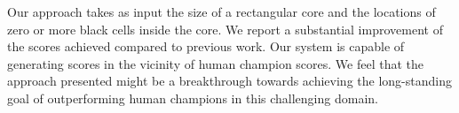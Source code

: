 
Our approach takes as input the size of a rectangular core
and the locations of zero or more black cells inside the core.
We report a substantial improvement of the scores achieved compared
to previous work.
Our system is capable of generating scores in the vicinity of human champion scores.
We feel that the approach presented might be a breakthrough towards achieving the long-standing goal of outperforming human champions in this challenging domain.